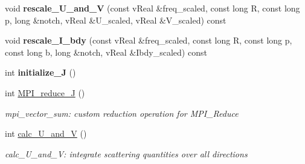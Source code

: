 \begin{DoxyCompactItemize}
void {\bfseries rescale\+\_\+\+U\+\_\+and\+\_\+V} (const v\+Real \&freq\+\_\+scaled, const long R, const long p, long \&notch, v\+Real \&U\+\_\+scaled, v\+Real \&V\+\_\+scaled) const
\item 
\mbox{\label{structRadiation_a36dcce5059f8d6f14c24feb06a1d52c4}} 
void {\bfseries rescale\+\_\+\+I\+\_\+bdy} (const v\+Real \&freq\+\_\+scaled, const long R, const long p, const long b, long \&notch, v\+Real \&Ibdy\+\_\+scaled) const
\item 
\mbox{\label{structRadiation_ad6c8c7bf0a4f451f29e053000bf4fa04}} 
int {\bfseries initialize\+\_\+J} ()
\item 
int \mbox{\hyperlink{structRadiation_a70b08565e0721c6b190cd161c6214368}{M\+P\+I\+\_\+reduce\+\_\+J}} ()
\begin{DoxyCompactList}\small\item\em mpi\+\_\+vector\+\_\+sum\+: custom reduction operation for M\+P\+I\+\_\+\+Reduce \end{DoxyCompactList}\item 
\mbox{\label{structRadiation_ad776dfdbd3d12eda801ea58648f68246}} 
int \mbox{\hyperlink{structRadiation_ad776dfdbd3d12eda801ea58648f68246}{calc\+\_\+\+U\+\_\+and\+\_\+V}} ()
\begin{DoxyCompactList}\small\item\em calc\+\_\+\+U\+\_\+and\+\_\+V\+: integrate scattering quantities over all directions \end{DoxyCompactList}\end{DoxyCompactItemize}
